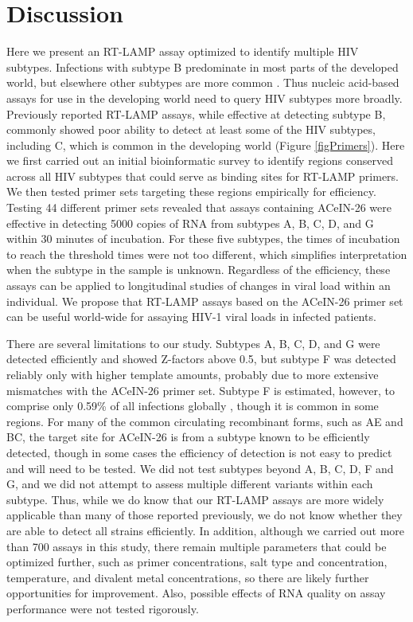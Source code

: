 \documentclass[../sherrill-Mix_thesis.tex]{subfiles}
\begin{document}
\section{Discussion}
	Here we present an RT-LAMP assay optimized to identify multiple HIV subtypes. Infections with subtype B predominate in most parts of the developed world, but elsewhere other subtypes are more common \citep{Buonaguro2007}. Thus nucleic acid-based assays for use in the developing world need to query HIV subtypes more broadly. Previously reported RT-LAMP assays, while effective at detecting subtype B, commonly showed poor ability to detect at least some of the HIV subtypes, including C, which is common in the developing world (Figure \ref{figPrimers}). Here we first carried out an initial bioinformatic survey to identify regions conserved across all HIV subtypes that could serve as binding sites for RT-LAMP primers. We then tested primer sets targeting these regions empirically for efficiency. Testing 44 different primer sets revealed that assays containing ACeIN-26 were effective in detecting 5000 copies of RNA from subtypes A, B, C, D, and G within 30 minutes of incubation. For these five subtypes, the times of incubation to reach the threshold times were not too different, which simplifies interpretation when the subtype in the sample is unknown. Regardless of the efficiency, these assays can be applied to longitudinal studies of changes in viral load within an individual. We propose that RT-LAMP assays based on the ACeIN-26 primer set can be useful world-wide for assaying HIV-1 viral loads in infected patients.

	There are several limitations to our study. Subtypes A, B, C, D, and G were detected efficiently and showed Z-factors above 0.5, but subtype F was detected reliably only with higher template amounts, probably due to more extensive mismatches with the ACeIN-26 primer set. Subtype F is estimated, however, to comprise only 0.59\% of all infections globally \citep{Buonaguro2007}, though it is common in some regions. For many of the common circulating recombinant forms, such as AE and BC, the target site for ACeIN-26 is from a subtype known to be efficiently detected, though in some cases the efficiency of detection is not easy to predict and will need to be tested. We did not test subtypes beyond A, B, C, D, F and G, and we did not attempt to assess multiple different variants within each subtype. Thus, while we do know that our RT-LAMP assays are more widely applicable than many of those reported previously, we do not know whether they are able to detect all strains efficiently. In addition, although we carried out more than 700 assays in this study, there remain multiple parameters that could be optimized further, such as primer concentrations, salt type and concentration, temperature, and divalent metal concentrations, so there are likely further opportunities for improvement. Also, possible effects of RNA quality on assay performance were not tested rigorously.
\end{document}
